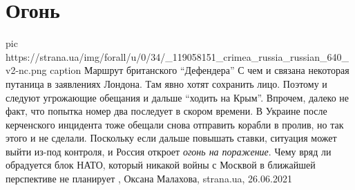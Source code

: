  
 
 
 
 
\chapter{Огонь}

\ifcmt
  pic https://strana.ua/img/forall/u/0/34/_119058151_crimea_russia_russian_640_v2-nc.png
  caption Маршрут британского \enquote{Дефендера}
\fi
С чем и связана некоторая путаница в заявлениях Лондона. Там явно хотят
сохранить лицо. Поэтому и следуют угрожающие обещания и дальше \enquote{ходить
на Крым}.  Впрочем, далеко не факт, что попытка номер два последует в скором
времени.  В Украине после керченского инцидента тоже обещали снова отправить
корабли в пролив, но так этого и не сделали. Поскольку если дальше повышать
ставки, ситуация может выйти из-под контроля, и Россия откроет \emph{огонь на
поражение}. Чему вряд ли обрадуется блок НАТО, который никакой войны с Москвой
в ближайшей перспективе не планирует
, 
Оксана Малахова, strana.ua, 26.06.2021

